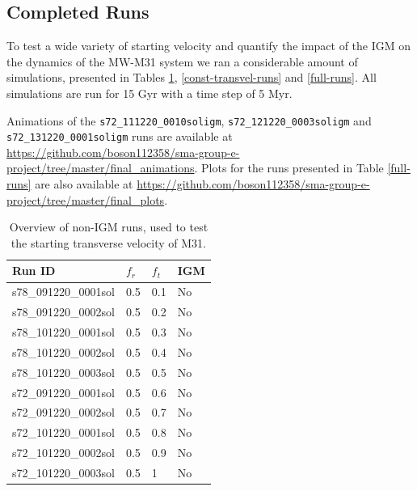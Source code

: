 \documentclass[a4paper,12pt, english]{article}
\begin{document}
\subsection{Completed Runs}
\label{completed-runs}
To test a wide variety of starting velocity and quantify the impact of the IGM on the dynamics of the MW-M31 system we ran a considerable amount of simulations, presented in Tables \ref{const-radvel-runs}, \ref{const-transvel-runs} and \ref{full-runs}. All simulations are run for 15 Gyr with a time step of 5 Myr.\par
\smallskip
Animations of the \texttt{s72\_111220\_0010soligm}, \texttt{s72\_121220\_0003soligm} and \texttt{s72\_131220\_0001soligm} runs are available at \url{https://github.com/boson112358/sma-group-e-project/tree/master/final_animations}. Plots for the runs presented in Table \ref{full-runs} are also available at \url{https://github.com/boson112358/sma-group-e-project/tree/master/final_plots}.\par
\begin{table}[!h]
\centering
\begin{tabular}{@{}l|l|l|l@{}}
\toprule
Run ID               & \(f_{r}\) & \(f_{t}\) & IGM \\ \midrule
s78\_091220\_0001sol & 0.5       & 0.1       & No  \\
s78\_091220\_0002sol & 0.5       & 0.2       & No  \\
s78\_101220\_0001sol & 0.5       & 0.3       & No  \\
s78\_101220\_0002sol & 0.5       & 0.4       & No  \\
s78\_101220\_0003sol & 0.5       & 0.5       & No  \\
s72\_091220\_0001sol & 0.5       & 0.6       & No  \\
s72\_091220\_0002sol & 0.5       & 0.7       & No  \\
s72\_101220\_0001sol & 0.5       & 0.8       & No  \\
s72\_101220\_0002sol & 0.5       & 0.9       & No  \\
s72\_101220\_0003sol & 0.5       & 1         & No  \\ \bottomrule
\end{tabular}
\caption{Overview of non-IGM runs, used to test the starting transverse velocity of M31.}
\label{const-radvel-runs}
\end{table}\par
\end{document}

